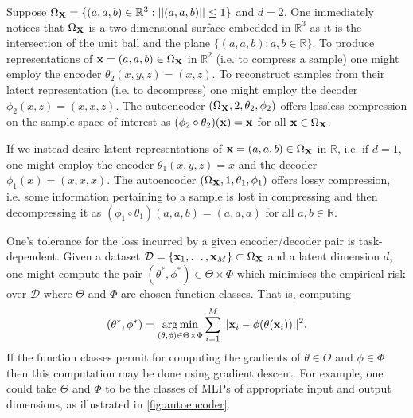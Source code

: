 \documentclass[11pt]{article}
\begin{document}
\begin{example}
    Suppose $\Omega_{\mathbf{X}}=\{(a,a,b)\in\mathbb{R}^3:||(a,a,b)||\leq1\}$ and $d=2$. One immediately notices that $\Omega_{\mathbf{X}}$ is a two-dimensional surface embedded in $\mathbb{R}^3$ as it is the intersection of the unit ball and the plane $\{(a,a,b):a,b\in\mathbb{R}\}$. To produce representations of $\mathbf{x}=(a,a,b)\in\Omega_{\mathbf{X}}$ in $\mathbb{R}^2$ (i.e. to compress a sample) one might employ the encoder $\theta_2(x,y,z)=(x,z)$. To reconstruct samples from their latent representation (i.e. to decompress) one might employ the decoder $\phi_2(x,z)=(x,x,z)$. The autoencoder $(\Omega_{\mathbf{X}},2,\theta_2,\phi_2)$ offers lossless compression on the sample space of interest as $(\phi_2\circ\theta_2)(\mathbf{x})=\mathbf{x}$ for all $\mathbf{x}\in\Omega_{\mathbf{X}}$.

    If we instead desire latent representations of $\mathbf{x}=(a,a,b)\in\Omega_{\mathbf{X}}$ in $\mathbb{R}$, i.e. if $d=1$, one might employ the encoder $\theta_1(x,y,z)=x$ and the decoder $\phi_1(x)=(x,x,x)$. The autoencoder $(\Omega_{\mathbf{X}},1,\theta_1,\phi_1)$ offers lossy compression, i.e. some information pertaining to a sample is lost in compressing and then decompressing it as $(\phi_1\circ\theta_1)(a,a,b)=(a,a,a)$ for all $a,b\in\mathbb{R}$.
\end{example}

One's tolerance for the loss incurred by a given encoder/decoder pair is task-dependent. Given a dataset $\mathcal{D}=\{\mathbf{x}_1,\dots,\mathbf{x}_M\}\subset\Omega_{\mathbf{X}}$ and a latent dimension $d$, one might compute the pair $(\theta^*,\phi^*)\in\Theta\times\Phi$ which minimises the empirical risk over $\mathcal{D}$ where $\Theta$ and $\Phi$ are chosen function classes. That is, computing
$$
(\theta^*,\phi^*)
=
\operatorname*{arg\,min}_{(\theta,\phi)\in\Theta\times\Phi}
\sum_{i=1}^M||\mathbf{x}_i-\phi(\theta(\mathbf{x}_i))||^2.
$$
If the function classes permit for computing the gradients of $\theta\in\Theta$ and $\phi\in\Phi$ then this computation may be done using gradient descent. For example, one could take $\Theta$ and $\Phi$ to be the classes of MLPs of appropriate input and output dimensions, as illustrated in \autoref{fig:autoencoder}.

\end{document}
